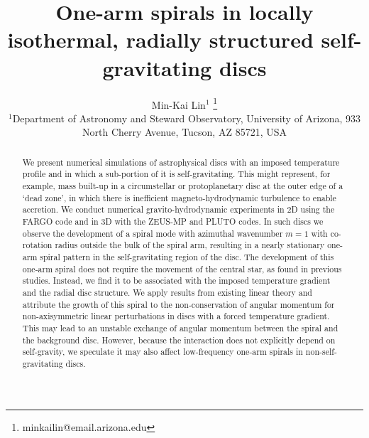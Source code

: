 \documentclass[useAMS,usenatbib]{mn2e}
\title[One-arm spirals]{One-arm spirals in 
  locally isothermal, radially structured self-gravitating discs}
\author[Lin]{Min-Kai Lin$^{1}$
  \thanks{ minkailin@email.arizona.edu} \\ 
  $^1$Department of Astronomy and Steward Observatory, University of
  Arizona, 933 North Cherry Avenue, Tucson, AZ 85721, USA 
}
\begin{document}
\maketitle
\begin{abstract} 
  We present numerical simulations of astrophysical discs with an 
  imposed temperature profile and in which a sub-portion of it is
  self-gravitating. This might represent, for example, mass  
  built-up in a circumstellar or protoplanetary
  disc at the outer edge of a `dead zone', in which there
  is inefficient magneto-hydrodynamic turbulence to enable accretion. 
  We conduct numerical gravito-hydrodynamic experiments in 2D using
  the FARGO code and in 3D with the ZEUS-MP and PLUTO codes. In such
  discs we observe the development of a 
  spiral mode with azimuthal wavenumber $m=1$ with co-rotation radius 
  outside the bulk of the spiral arm, resulting in a nearly stationary 
  one-arm spiral pattern in the self-gravitating region of the
  disc. The development of this one-arm 
  spiral does not require the movement of  
  the central star, as found in previous studies. Instead, we find it 
  to be associated with the imposed 
  temperature gradient and the radial disc structure. 
  We apply results from existing linear theory and attribute the
  growth of this spiral to the non-conservation of angular momentum
  for non-axisymmetric linear perturbations in discs with a forced temperature
  gradient. This may lead to an unstable exchange of angular momentum between the spiral 
  and the background disc. However, because the interaction does
  not explicitly depend on self-gravity, we speculate it may also
  affect low-frequency one-arm spirals in non-self-gravitating
  discs. 

\end{abstract}
\end{document}

